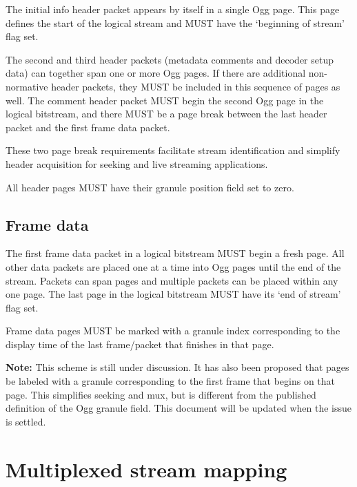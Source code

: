 \documentclass[9pt,letterpaper]{book}
\numberwithin{equation}{chapter}
\numberwithin{figure}{chapter}
\numberwithin{table}{chapter}
\begin{document}
The initial info header packet appears by itself in a single Ogg page.
This page defines the start of the logical stream and MUST have
 the `beginning of stream' flag set.

The second and third header packets (metadata comments and decoder
 setup data) can together span one or more Ogg pages.
If there are additional non-normative header packets, they MUST be
 included in this sequence of pages as well.
The comment header packet MUST begin the second Ogg page in the logical
 bitstream, and there MUST be a page break between the last header
 packet and the first frame data packet.

These two page break requirements facilitate stream identification and
 simplify header acquisition for seeking and live streaming applications.

All header pages MUST have their granule position field set to zero.

\subsection{Frame data}

The first frame data packet in a logical bitstream MUST begin a fresh page.
All other data packets are placed one at a time into Ogg pages
 until the end of the stream.
Packets can span pages and multiple packets can be placed within any
 one page.
The last page in the logical bitstream MUST have its `end of stream'
 flag set.

Frame data pages MUST be marked with a granule index corresponding to
 the display time of the last frame/packet that finishes in that page.

{\bf Note:}
This scheme is still under discussion.
It has also been proposed that pages be labeled with a granule corresponding to
 the first frame that begins on that page.
This simplifies seeking and mux, but is different from the published
 definition of the Ogg granule field.
This document will be updated when the issue is settled.


\section{Multiplexed stream mapping}
\end{document}
